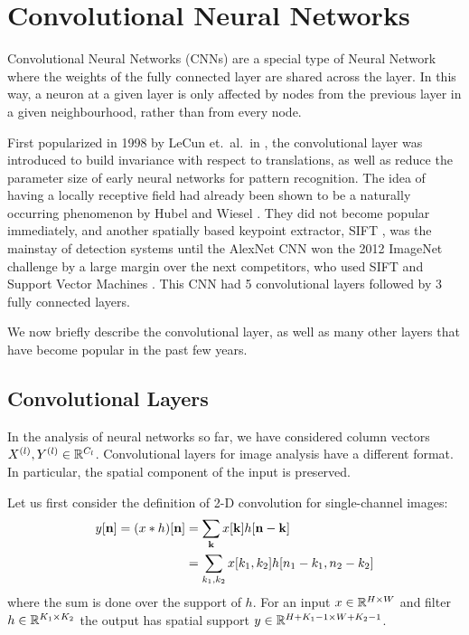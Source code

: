 \section{Convolutional Neural Networks}
Convolutional Neural Networks (CNNs) are a special type of Neural Network where the
weights of the fully connected layer are shared across the layer. 
In this way, a neuron at a given layer is only affected by
nodes from the previous layer in a given neighbourhood, rather than from every node.

First popularized in 1998 by LeCun et.\ al.\ in \cite{lecun_gradient-based_1998},
the convolutional layer was introduced to build invariance with respect to
translations, as well as reduce the parameter size of early neural networks for
pattern recognition. The idea of having a locally receptive field had already
been shown to be a naturally occurring phenomenon by Hubel and Wiesel
\cite{hubel_receptive_1962}. They did not become popular immediately, and
another spatially based keypoint extractor, SIFT \cite{lowe_distinctive_2004},
was the mainstay of detection systems until the AlexNet CNN
\cite{krizhevsky_imagenet_2012} won the 2012 ImageNet challenge
\cite{russakovsky_imagenet_2014} by a large margin over the next competitors, who
used SIFT and Support Vector Machines \cite{cortes_support-vector_1995}. This
CNN had 5 convolutional layers followed by 3 fully connected layers.

We now briefly describe the convolutional layer, as well as many other layers
that have become popular in the past few years.

\subsection{Convolutional Layers}\label{sec:ch2:conv_layers}
In the analysis of neural networks so far, we have considered column vectors 
$X^{(l)},Y^{(l)} \in \reals[C_{l}]$. Convolutional layers for image analysis
have a different format. In particular, the spatial component of the input is
preserved. 

Let us first consider the definition of 2-D convolution for single-channel
images:
\begin{align}
  y[\nn] = (x\conv h)[\nn] &= \sum_{\mathbf{k}} x[\mathbf{k}]h[\nn-\mathbf{k}] \label{eq:ch2:conv1}\\
                           &= \sum_{k_1, k_2} x[k_1,k_2]h[n_1-k_1, n_2-k_2]
\end{align}
where the sum is done over the support of $h$. For an input $x\in \reals[H\x W]$
and filter $h\in \reals[K_1\x K_2]$ the output has spatial support $y\in
\reals[H+K_1-1 \x W+K_2-1]$. 

